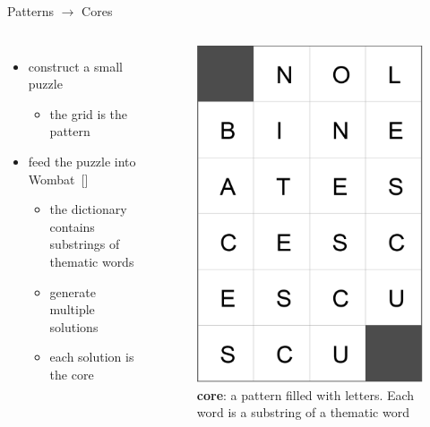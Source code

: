 \documentclass[aspectratio=169,usenames,dvipsnames]{beamer}
\newcommand{\bei}{\begin{itemize}}
\newcommand{\eei}{\end{itemize}}
\newcommand{\ie}{\item}
\numberwithin{equation}{section}
\numberwithin{theorem}{section}
\numberwithin{lem}{section}
\numberwithin{df}{section}
\begin{document}


\begin{frame}{Patterns $\to$ Cores}

\begin{columns}

\bei
\ie construct a small puzzle
\bei 
\ie the grid is the pattern
\eei

\bigskip

\ie feed the puzzle into {\sc Wombat}~[\cite{DBLP:conf/socs/BoteaB21}]
\bei 
\ie the dictionary contains substrings of thematic words
\ie generate multiple solutions 
\ie each solution is the core
\eei
\eei


\begin{figure}
\includegraphics[width=0.7\columnwidth]{_plots/core-6x4-puzzle.png}
\caption{{\bf core}: a pattern filled with letters. Each word is a substring of a thematic word}
\end{figure}

\end{columns}

\end{frame}
\end{document}
